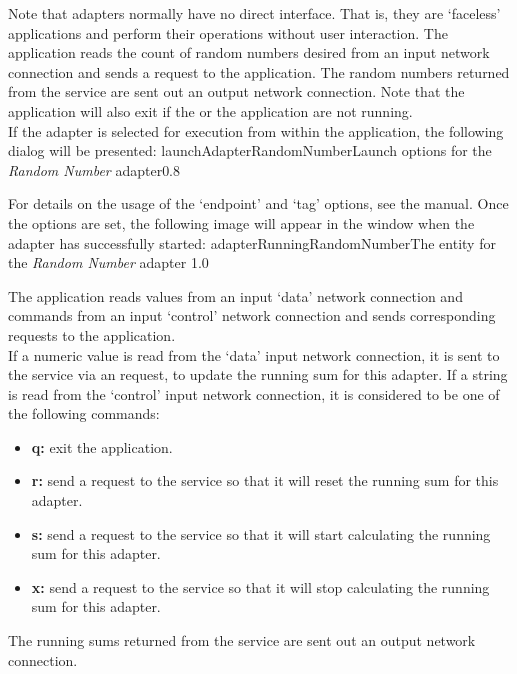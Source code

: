 Note that adapters normally have no direct interface.
That is, they are `faceless' applications and perform their operations without user
interaction.
\condPage
{}
The  application reads the count of
random numbers desired from an input \yarp{} network connection and sends a
 request to the
 application.
The random numbers returned from the service are sent out an output \yarp{} network
connection.
Note that the application will also exit if the  or the
 application are not running.\\

If the adapter is selected for execution from within the \emph{\CMU} application, the
following dialog will be presented:
%
{launchAdapterRandomNumber}{Launch options for the \emph{Random Number} adapter}{0.8}

For details on the usage of the `endpoint' and `tag' options, see the \emph{\CMU} manual.
Once the options are set, the following image will appear in the \emph{\CMU} window when
the adapter has successfully started:
%
{adapterRunningRandomNumber}{The \emph{\CMU} entity for the \emph{Random Number} adapter}%
{1.0}

The  application reads  values from an input
`data' \yarp{} network connection and commands from an input `control' \yarp{} network
connection and sends corresponding requests to the
 application.\\

If a numeric value is read from the `data' input \yarp{} network connection, it is sent to
the service via an  request, to update the
running sum for this adapter.
If a string is read from the `control' input \yarp{} network connection, it is considered
to be one of the following commands:
\begin{itemize}
\item\textbf{q:} exit the application.
\item\exSp\textbf{r:} send a  request to the
service so that it will reset the running sum for this adapter.
\item\exSp\textbf{s:} send a  request to the
service so that it will start calculating the running sum for this adapter.
\item\exSp\textbf{x:} send a  request to the
service so that it will stop calculating the running sum for this adapter.
\end{itemize}
The running sums returned from the service are sent out an output \yarp{} network
connection.\\


